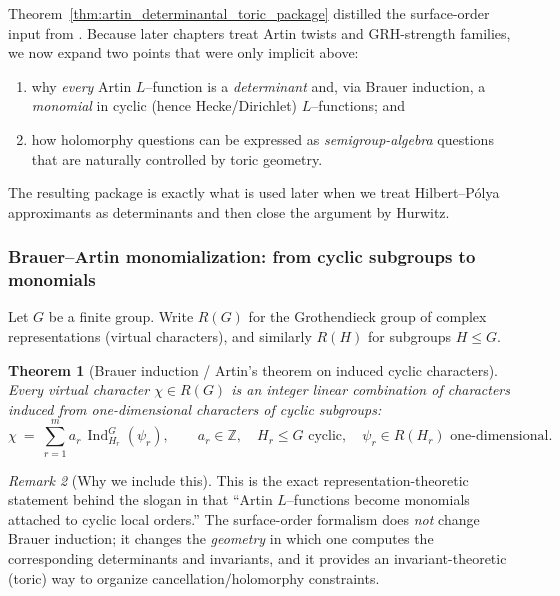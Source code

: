 \documentclass[11pt,oneside]{amsbook}
\numberwithin{equation}{section}
\theoremstyle{plain}
\newtheorem{theorem}{Theorem}[section]
\theoremstyle{definition}
\theoremstyle{remark}
\newtheorem{remark}[theorem]{Remark}
\newcommand{\Ind}{\operatorname{Ind}}
\begin{document}
Theorem~\ref{thm:artin_determinantal_toric_package} distilled the surface-order input from \cite{Schreiber2018SurfaceAlgebrasI}.
Because later chapters treat Artin twists and GRH-strength families, we now expand two points that were only implicit above:
\begin{enumerate}[label=(\roman*)]
\item why \emph{every} Artin $L$--function is a \emph{determinant} and, via Brauer induction, a \emph{monomial} in cyclic (hence Hecke/Dirichlet) $L$--functions; and
\item how holomorphy questions can be expressed as \emph{semigroup-algebra} questions that are naturally controlled by toric geometry.
\end{enumerate}
The resulting package is exactly what is used later when we treat Hilbert--Pólya approximants as determinants and then close the argument by Hurwitz.

\subsubsection{Brauer--Artin monomialization: from cyclic subgroups to monomials}
Let $G$ be a finite group.
Write $R(G)$ for the Grothendieck group of complex representations (virtual characters), and similarly $R(H)$ for subgroups $H\le G$.

\begin{theorem}[Brauer induction / Artin's theorem on induced cyclic characters]
\label{thm:brauer_induction_cyclic}
Every virtual character $\chi\in R(G)$ is an \emph{integer} linear combination of characters induced from \emph{one-dimensional} characters of \emph{cyclic} subgroups:
\[
\chi\ =\ \sum_{r=1}^m a_r\,\Ind_{H_r}^G(\psi_r),
\qquad
a_r\in\mathbb{Z},
\quad
H_r\le G\text{ cyclic},
\quad
\psi_r\in R(H_r)\text{ one-dimensional}.
\]
\end{theorem}

\begin{remark}[Why we include this]
This is the exact representation-theoretic statement behind the slogan in \cite[\S14]{Schreiber2018SurfaceAlgebrasI} that ``Artin $L$--functions become monomials attached to cyclic local orders.''
The surface-order formalism does \emph{not} change Brauer induction; it changes the \emph{geometry} in which one computes the corresponding determinants and invariants, and it provides an invariant-theoretic (toric) way to organize cancellation/holomorphy constraints.
\end{remark}
\end{document}
